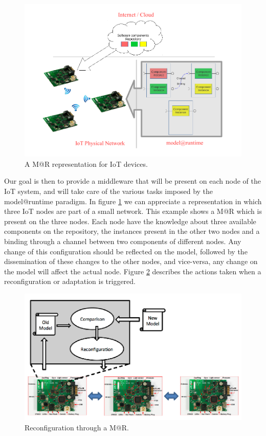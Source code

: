 \begin{figure}[]
	\centering
	\includegraphics[width=1\columnwidth]{chapters/modelsAtRuntimeContiki.images/MAR_IOT.pdf}
	\caption{A M@R representation for IoT devices.}
	\label{fig:MAR_IOT}
\end{figure}

Our goal is then to provide a middleware that will be present on each node of the IoT system, and will take care of the various tasks imposed by the model@runtime paradigm.
In figure \ref{fig:MAR_IOT} we can appreciate a representation in which three IoT nodes are part of a small network.
This example shows a M@R which is present on the three nodes.
Each node have the knowledge about three available components on the repository, the instances present in the other two nodes and a binding through a channel between two components of different nodes.
Any change of this configuration should be reflected on the model, followed by the dissemination of these changes to the other nodes, and vice-versa, any change on the model will affect the actual node.
Figure \ref{fig:MAR_reconfig} describes the actions taken when a reconfiguration or adaptation is triggered.

\begin{figure}[]
	\centering
	\includegraphics[width=1\columnwidth]{chapters/modelsAtRuntimeContiki.images/MAR_reconfig.pdf}
	\caption{Reconfiguration through a M@R.}
	\label{fig:MAR_reconfig}
\end{figure}

